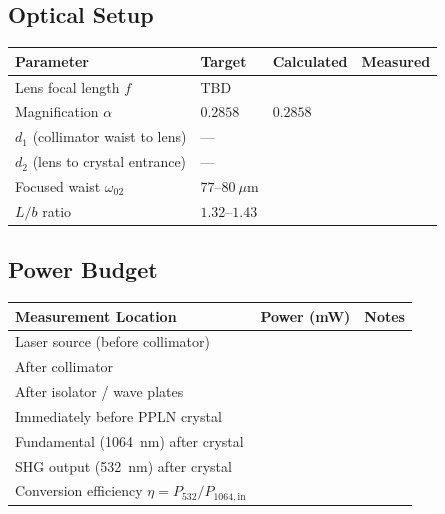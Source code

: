 \documentclass[11pt, letterpaper]{article}
\newcommand{\blank}[1][3cm]{\underline{\hspace{#1}}}
\begin{document}
\subsection*{Optical Setup}
\smallskip
\renewcommand{\arraystretch}{1.6}
\begin{tabular}{@{}p{5.5cm}lll@{}}
\toprule
\textbf{Parameter} & \textbf{Target} & \textbf{Calculated} & \textbf{Measured} \\
\midrule
Lens focal length $f$                  & TBD              & \blank[2cm] & \blank[2cm] \\
Magnification $\alpha$                 & $0.2858$         & $0.2858$    & \blank[2cm] \\
$d_1$ (collimator waist to lens)       & ---              & \blank[2cm] & \blank[2cm] \\
$d_2$ (lens to crystal entrance)       & ---              & \blank[2cm] & \blank[2cm] \\
Focused waist $\omega_{02}$            & $77$--$80~\mu$m  & \blank[2cm] & \blank[2cm] \\
$L/b$ ratio                            & $1.32$--$1.43$   & \blank[2cm] & \blank[2cm] \\
\bottomrule
\end{tabular}
\renewcommand{\arraystretch}{1}

\subsection*{Power Budget}
\smallskip
\renewcommand{\arraystretch}{1.6}
\begin{tabular}{@{}p{7cm}ll@{}}
\toprule
\textbf{Measurement Location} & \textbf{Power (mW)} & \textbf{Notes} \\
\midrule
Laser source (before collimator)        & \blank & \\
After collimator                        & \blank & \\
After isolator / wave plates            & \blank & \\
Immediately before PPLN crystal         & \blank & \\
Fundamental (1064~nm) after crystal     & \blank & \\
SHG output (532~nm) after crystal       & \blank & \\
Conversion efficiency $\eta = P_{532}/P_{1064,\text{in}}$ & \blank & \\
\bottomrule
\end{tabular}
\renewcommand{\arraystretch}{1}
\end{document}
